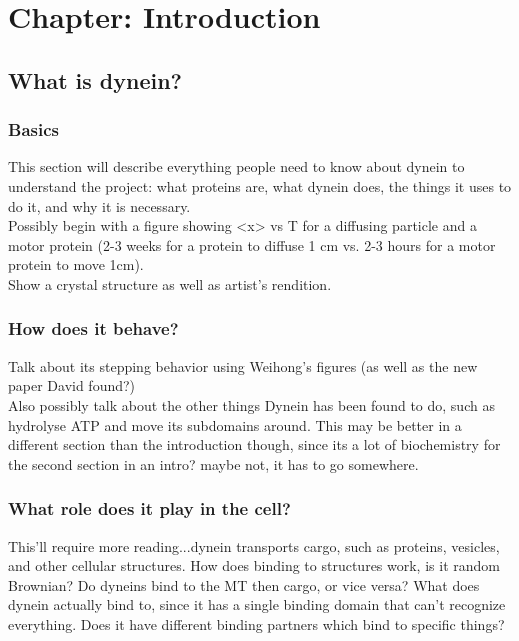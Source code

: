\documentclass[10pt]{article} %
\begin{document}
\tableofcontents
\newpage

\section{Chapter: Introduction}
\subsection{What is dynein?}
\subsubsection{Basics}
This section will describe everything people need to know about dynein to understand the project:
what proteins are, what dynein does, the things it uses to do it, and why it is necessary.\\

Possibly begin with a figure showing <x> vs T for a diffusing particle and a motor protein (2-3 weeks
for a protein to diffuse 1 cm vs. 2-3 hours for a motor protein to move 1cm).\\

Show a crystal structure as well as artist's rendition.\\

\subsubsection{How does it behave?}
Talk about its stepping behavior using Weihong's figures (as well as the new paper David found?)\\

Also possibly talk about the other things Dynein has been found to do, such as hydrolyse ATP and
move its subdomains around. This may be better in a different section than the introduction though,
since its a lot of biochemistry for the second section in an intro? maybe not, it has to go somewhere.

\subsubsection{What role does it play in the cell?}
This'll require more reading...dynein transports cargo, such as proteins, vesicles, and other cellular structures. How does binding to structures work, is it random Brownian? Do dyneins bind to the MT then cargo, or vice versa? What does dynein actually bind to, since it has a single binding domain that
can't recognize everything. Does it have different binding partners which bind to specific things?\\
\end{document}
